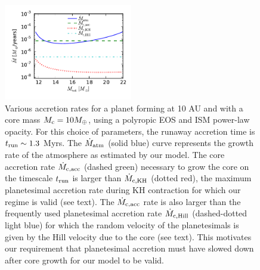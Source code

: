\documentclass[apj]{emulateapj}
\newcommand{\co}{_{\rm c}}
\begin{document}


 \begin{figure}[h]
\centering
\includegraphics[width=0.5\textwidth]{../../figs/ModelAtmospheres/RadSelfGravRealEOS/PaperFigs/acc_rates_paper.pdf}
\caption{Various accretion rates for a planet forming at 10 AU and with a core mass $M\co=10 M_{\oplus}$, using a polyropic EOS and ISM power-law opacity. For this choice of parameters, the runaway accretion time is $t_{\rm run} \sim 1.3$ Myrs. The $\dot{M}_{\rm{atm}}$ (solid blue) curve represents the growth rate of the atmosphere as estimated by our model. The core accretion rate $\dot{M}_{\rm c, acc}$ (dashed green) necessary to grow the core on the timescale $t_{\rm run}$ is larger than $\dot{M}_{\rm c, KH}$ (dotted red), the maximum planetesimal accretion rate during KH contraction for which our regime is valid (see text). The $\dot{M}_{\rm c, acc}$ rate is also larger than the frequently used planetesimal accretion rate $\dot{M}_{\rm c, Hill}$ (dashed-dotted light blue) for which the random velocity of the planetesimals is given by the Hill velocity due to the core (see text). 
This motivates our requirement  that planetesimal accretion must have slowed down after core growth for our model to be valid.}

\label{fig:accrates}
\end{figure}
\end{document}
